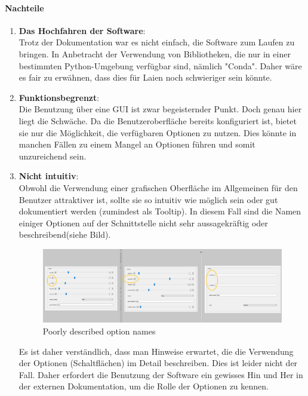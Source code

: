 	\paragraph{Nachteile}
		\begin{enumerate}
				\item \textbf{Das Hochfahren der Software}:\\
				Trotz der Dokumentation war es nicht einfach, die Software zum Laufen zu bringen. In Anbetracht der Verwendung von Bibliotheken, die nur in einer bestimmten Python-Umgebung  verfügbar sind, nämlich "Conda".
Daher wäre es fair zu erwähnen, dass dies für Laien noch schwieriger sein könnte.
				
    			\item \textbf{Funktionsbegrenzt}:\\
				Die Benutzung über eine GUI ist zwar begeisternder Punkt. Doch genau hier liegt die Schwäche. Da die Benutzeroberfläche bereits konfiguriert ist, bietet sie nur die Möglichkeit, die verfügbaren Optionen zu nutzen. Dies könnte in manchen Fällen zu einem Mangel an Optionen führen und somit unzureichend sein.    			
    			
    			\item \textbf{Nicht intuitiv}:\\
    			Obwohl die Verwendung einer grafischen Oberfläche im Allgemeinen für den Benutzer attraktiver ist, sollte sie so intuitiv wie möglich sein oder gut dokumentiert werden (zumindest als Tooltip).
In diesem Fall sind die Namen einiger Optionen auf der Schnittstelle nicht sehr aussagekräftig oder beschreibend(siehe Bild).
\begin{figure}[H]
    \centering
    \includegraphics[scale=0.35]{Grafiken/particletracker/Not intuitive.png}
    \caption{Poorly described option names}
    \label{fig:bild_label}
\end{figure}
Es ist daher verständlich, dass man Hinweise erwartet, die die Verwendung der Optionen (Schaltflächen) im Detail beschreiben. 
Dies ist leider nicht der Fall. Daher erfordert die Benutzung der Software ein gewisses Hin und Her in der externen Dokumentation, um die Rolle der Optionen zu kennen.
		\end{enumerate}
		
